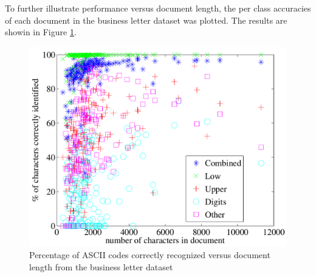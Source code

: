 \documentclass[times, 10pt,twocolumn]{article}
\begin{document}
To further illustrate performance versus document length, the per class
accuracies of each document in the business letter dataset was plotted.  The
results are showin in Figure \ref{acc_v_doclen_fig}.

\begin{figure}[ht]
  \centering
  \includegraphics[scale=.5]{figures/acc_v_doclen}
  \caption{Percentage of ASCII codes correctly recognized versus document
  length from the business letter dataset}
  \label{acc_v_doclen_fig}
\end{figure}


%
%
%  



\end{document}
